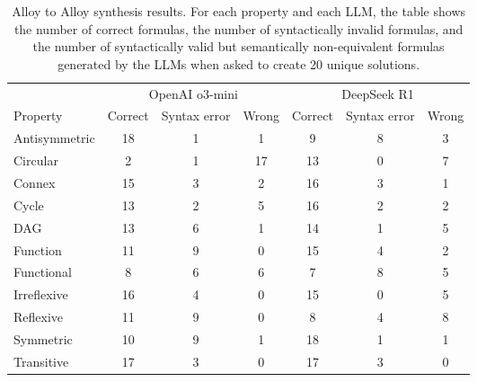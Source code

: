\begin{table*}[!t]
\centering
\begin{tabular}{l|ccc|ccc}
\toprule
 & \multicolumn{3}{c|}{OpenAI o3-mini} & \multicolumn{3}{c}{DeepSeek R1} \\
Property & Correct & \hspace*{2ex}Syntax error\hspace*{2ex} & Wrong & Correct & \hspace*{2ex}Syntax error\hspace*{2ex} & Wrong \\ \hline
Antisymmetric & 18 & 1 & 1 & 9 & 8 & 3 \\
Circular      & 2 & 1 & 17 & 13 & 0 & 7 \\
Connex        & 15 & 3 & 2 & 16 & 3 & 1 \\
Cycle         & 13 & 2 & 5 & 16 & 2 & 2 \\
DAG           & 13 & 6 & 1 & 14 & 1 & 5 \\
Function      & 11 & 9 & 0 & 15 & 4 & 2 \\
Functional    & 8 & 6 & 6 & 7 & 8 & 5 \\
Irreflexive   & 16 & 4 & 0 & 15 & 0 & 5 \\
Reflexive     & 11 & 9 & 0 & 8 & 4 & 8 \\
Symmetric     & 10 & 9 & 1 & 18 & 1 & 1 \\
Transitive    & 17 & 3 & 0 & 17 & 3 & 0 \\
\bottomrule
\end{tabular}
\vspace*{2ex}
\caption{Alloy to Alloy synthesis results.  For each property and each
  LLM, the table shows the number of correct formulas, the number of syntactically invalid formulas, and the number of syntactically valid but
  semantically non-equivalent formulas generated by the
  LLMs when asked to create 20 unique solutions.}
\label{tab:AlloyToAlloy-results}
\vspace*{-2ex}
\end{table*}

